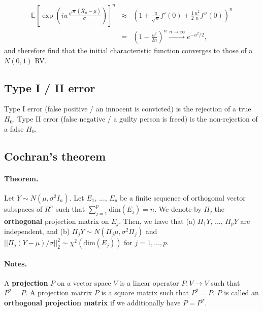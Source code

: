 \documentclass[]{article}
\begin{document}
\begin{eqnarray}
\mathbb{E}\left[\exp\left(iu\frac{\sqrt{n}(\bar{X}_n-\mu)}{\sigma}\right)\right]^n &\approx& \left(1+\frac{u}{\sqrt{n}}f'(0)+\frac{1}{2}\frac{u^2}{n}f''(0)\right)^n \\
&=& \left(1-\frac{u^2}{2n}\right)^n\xrightarrow{n \to \infty}e^{-u^2/2},
\end{eqnarray}
and therefore find that the initial characteristic function converges to those of a $N(0,1)$ RV.

\subsection{Type I / II error}

Type I error (false positive / an innocent is convicted) is the rejection of a true $H_0$. Type II error (false negative / a guilty person is freed) is the non-rejection of a false $H_0$.

\subsection{Cochran's theorem}

\paragraph{Theorem.} Let $Y\sim N(\mu, \sigma^2 I_n)$. Let $E_1$, ..., $E_p$ be a finite sequence of orthogonal vector subspaces of $R^n$ such that $\sum_{j=1}^p \mathrm{dim}(E_j) = n$. We denote by $\Pi_j$ the \textbf{orthogonal} projection matrix on $E_j$. Then, we have that (a) $\Pi_1 Y$, ..., $\Pi_p Y$ are independent, and (b) $\Pi_j Y \sim N(\Pi_j\mu, \sigma^2\Pi_j)$ and $||\Pi_j (Y-\mu)/\sigma||_2^2 \sim \chi^2(\mathrm{dim}(E_j))$ for $j=1,...,p$.

\paragraph{Notes.} A \textbf{projection} $P$ on a vector space $V$ is a linear operator $P: V \rightarrow V$ such that $P^2=P$. A projection matrix $P$ is a square matrix such that $P^2=P$. $P$ is called an \textbf{orthogonal projection matrix} if we additionally have $P=P^T$.
\end{document}
